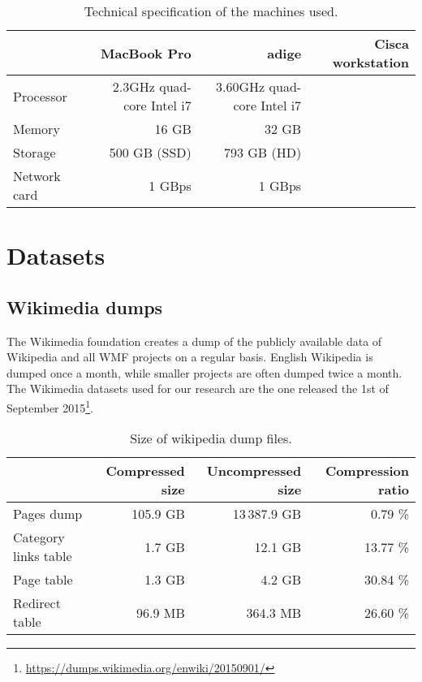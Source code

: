 \begin{table}[]
\centering
\caption{Technical specification of the machines used.}
\label{tbl:tech_specs}
\begin{tabular}{@{}lrrr@{}}
\toprule
\multicolumn{1}{c}{\textbf{}} & \textbf{MacBook Pro}           & \textbf{adige}                  & \textbf{Cisca workstation} \\ \midrule
Processor                     & 2.3GHz quad-core Intel i7 & 3.60GHz quad-core Intel i7 &                            \\
Memory                        & 16 GB                          & 32 GB                           &                            \\
Storage                       & 500 GB (SSD)                   & 793 GB (HD)                     &                            \\
Network card                  & 1 GBps                         & 1 GBps                          &                            \\ \bottomrule
\end{tabular}
\end{table}

\section{Datasets}
\label{sec:datasets}

\subsection{Wikimedia dumps}
The Wikimedia foundation creates a dump of the publicly available data of Wikipedia and all WMF projects on a regular basis.
English Wikipedia is dumped once a month, while smaller projects are often dumped twice a month.
The Wikimedia datasets used for our research are the one released the 1st of September 2015\footnote{\url{https://dumps.wikimedia.org/enwiki/20150901/}}.

\begin{table}[]
\centering
\caption{Size of wikipedia dump files.}
\label{tbl:wikidumps_size}
\begin{tabular}{@{}lrrr@{}}
\multicolumn{1}{c}{\textbf{}} & \textbf{Compressed size} & \textbf{Uncompressed size} & \textbf{Compression ratio} \\ \midrule
Pages dump              &     105.9 GB &   13\,387.9 GB &  0.79 \% \\
Category links table    &       1.7 GB &        12.1 GB & 13.77 \% \\
Page table              &       1.3 GB &         4.2 GB & 30.84 \% \\
Redirect table          &      96.9 MB &       364.3 MB & 26.60 \%
\end{tabular}
\end{table}

